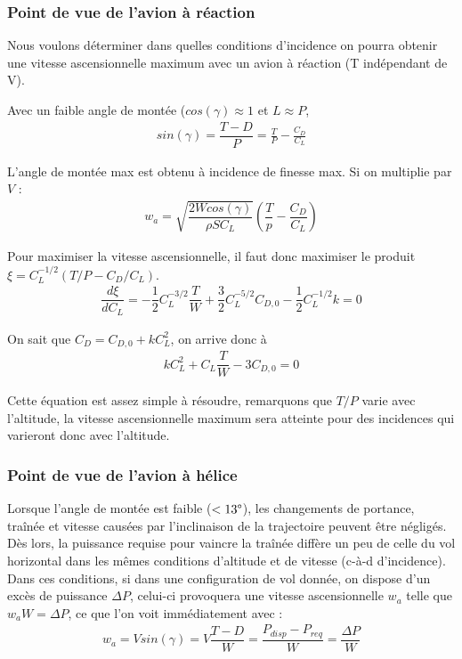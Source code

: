 \documentclass{report}
\begin{document}
\subsubsection{Point de vue de l'avion à réaction}

Nous voulons déterminer dans quelles conditions d'incidence on pourra obtenir une vitesse ascensionnelle maximum avec un avion à réaction (T indépendant de V).

Avec un faible angle de montée ($cos(\gamma)\approx 1$ et $L\approx P$,
\begin{eqnarray}
sin(\gamma) = \dfrac{T-D}{P}=\frac{T}{P}-\frac{C_D}{C_L}
\end{eqnarray}

L'angle de montée max est obtenu à incidence de finesse max. Si on multiplie par $V$ :
\begin{eqnarray}
w_a = \sqrt{\dfrac{2Wcos(\gamma)}{\rho SC_L}}\left(\dfrac{T}{p}-\dfrac{C_D}{C_L}\right)
\end{eqnarray}

Pour maximiser la vitesse ascensionnelle, il faut donc maximiser le produit $\xi =C_L^{-1/2}(T/P-C_D/C_L)$.
\begin{eqnarray}
\dfrac{d\xi}{dC_L}=-\dfrac{1}{2}C_L^{-3/2}\dfrac{T}{W}+\dfrac{3}{2}C_L^{-5/2}C_{D,0}-\dfrac{1}{2}C_L^{-1/2}k=0
\end{eqnarray}

On sait que $C_D=C_{D,0}+kC_L^2$, on arrive donc à
\begin{eqnarray}
kC_L^2+C_L\dfrac{T}{W}-3C_{D,0}=0
\end{eqnarray}

Cette équation est assez simple à résoudre, remarquons que $T/P$ varie avec l'altitude, la vitesse ascensionnelle maximum sera atteinte pour des incidences qui varieront donc avec l'altitude.

\subsubsection{Point de vue de l'avion à hélice}

Lorsque l'angle de montée est faible ($<13\degree$), les changements de portance, traînée et vitesse causées par l'inclinaison de la trajectoire peuvent être négligés. Dès lors, la puissance requise pour vaincre la traînée diffère un peu de celle du vol horizontal dans les mêmes conditions d'altitude et de vitesse (c-à-d d'incidence). Dans ces conditions, si dans une configuration de vol donnée, on dispose d'un excès de puissance $\Delta P$, celui-ci provoquera une vitesse ascensionnelle $w_a$ telle que $w_aW=\Delta P$, ce que l'on voit immédiatement avec :
\begin{eqnarray}
w_a = Vsin(\gamma)=V\dfrac{T-D}{W}=\dfrac{P_{disp}-P_{req}}{W}=\dfrac{\Delta P}{W}
\end{eqnarray}
\end{document}
